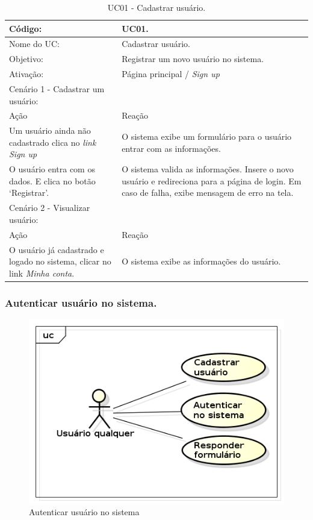\documentclass[11pt]{article}
\begin{document}
        \begin{table}[h]
          \begin{center}
            \begin{tabular}{ | p{7cm} | p{8cm} | }
              \hline
              Código: \cellcolor{gray} & UC01. \\
              \hline
              Nome do UC: \cellcolor{gray} & Cadastrar usuário. \\
              \hline
              Objetivo: \cellcolor{gray} & Registrar um novo usuário no sistema. \\
              \hline
              Ativação: \cellcolor{gray} & Página principal / \em Sign up \\
              \hline
              \hline
              Cenário 1 - Cadastrar um usuário: &  \\
              \hline
              Ação\cellcolor{gray} & Reação\cellcolor{gray} \\
              \hline
              Um usuário ainda não cadastrado clica no \em link Sign up & O sistema exibe um formulário para o usuário entrar com as informações. \\
              \hline
              O usuário entra com os dados. E clica no botão ‘Registrar’. & O sistema valida as informações. Insere o novo usuário e redireciona para a página de login. Em caso de falha, exibe mensagem de erro na tela. \\
              \hline
              \hline
              Cenário 2 - Visualizar usuário: &  \\
              \hline
              Ação\cellcolor{gray} & Reação\cellcolor{gray} \\
              \hline
              O usuário já cadastrado e logado no sistema, clicar no link {\em Minha conta}. & O sistema exibe as informações do usuário. \\
              \hline
            \end{tabular}
            \caption{UC01 - Cadastrar usuário.}
          \end{center}
        \end{table}

    \clearpage

      \subsubsection{Autenticar usuário no sistema.}

        \begin{figure}[h!]
          \centering
          \includegraphics[width=.5\textwidth]{auth_create_user.png}
          \caption{Autenticar usuário no sistema}
        \end{figure}
\end{document}
